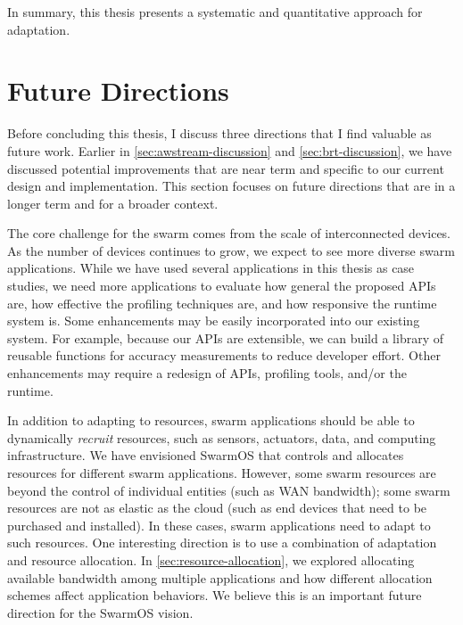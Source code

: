 \documentclass[thesis.tex]{subfiles}
\begin{document}
In summary, this thesis presents a systematic and quantitative approach for
adaptation.

\section{Future Directions}
\label{sec:future-directions}

Before concluding this thesis, I discuss three directions that I find valuable
as future work. Earlier in \autoref{sec:awstream-discussion} and
\autoref{sec:brt-discussion}, we have discussed potential improvements that are
near term and specific to our current design and implementation. This section
focuses on future directions that are in a longer term and for a broader
context.

 The core challenge for the
swarm comes from the scale of interconnected devices. As the number of devices
continues to grow, we expect to see more diverse swarm applications. While we
have used several applications in this thesis as case studies, we need more
applications to evaluate how general the proposed APIs are, how effective the
profiling techniques are, and how responsive the runtime system is. Some
enhancements may be easily incorporated into our existing system. For example,
because our APIs are extensible, we can build a library of reusable functions
for accuracy measurements to reduce developer effort. Other enhancements may
require a redesign of APIs, profiling tools, and/or the runtime.

 In addition to adapting to resources,
swarm applications should be able to dynamically \emph{recruit} resources, such
as sensors, actuators, data, and computing infrastructure. We have envisioned
SwarmOS that controls and allocates resources for different swarm
applications. However, some swarm resources are beyond the control of individual
entities (such as WAN bandwidth); some swarm resources are not as elastic as the
cloud (such as end devices that need to be purchased and installed). In these
cases, swarm applications need to adapt to such resources. One interesting
direction is to use a combination of adaptation and resource allocation. In
\autoref{sec:resource-allocation}, we explored allocating available bandwidth
among multiple applications and how different allocation schemes affect
application behaviors. We believe this is an important future direction for the
SwarmOS vision.
\end{document}
